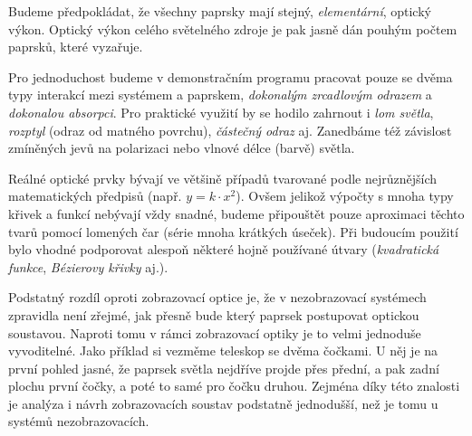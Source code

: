 Budeme předpokládat, že všechny paprsky mají stejný, \emph{elementární}, optický výkon. Optický výkon celého světelného zdroje je pak jasně dán pouhým počtem paprsků, které vyzařuje.

Pro jednoduchost budeme v demonstračním programu pracovat pouze se dvěma typy interakcí mezi systémem a paprskem, \emph{dokonalým zrcadlovým odrazem} a \emph{dokonalou absorpci}. Pro praktické využití by se hodilo zahrnout i \emph{lom světla}, \emph{rozptyl} (odraz od matného povrchu), \emph{částečný odraz} aj. Zanedbáme též závislost zmíněných jevů na polarizaci nebo vlnové délce (barvě) světla.



Reálné optické prvky bývají ve většině případů tvarované podle nejrůznějších matematických předpisů (např. $y = k \cdot x^2$). Ovšem jelikož výpočty s mnoha typy křivek a funkcí nebývají vždy snadné, budeme připouštět pouze aproximaci těchto tvarů pomocí lomených čar (série mnoha krátkých úseček). Při budoucím použití bylo vhodné podporovat alespoň některé hojně používané útvary (\emph{kvadratická funkce}, \emph{Bézierovy křivky} aj.).


Podstatný rozdíl oproti zobrazovací optice je, že v nezobrazovací systémech zpravidla není zřejmé, jak přesně bude který paprsek postupovat optickou soustavou. Naproti tomu v rámci zobrazovací optiky je to velmi jednoduše vyvoditelné. Jako příklad si vezměme teleskop se dvěma čočkami. U něj je na první pohled jasné, že paprsek světla nejdříve projde přes přední, a pak zadní plochu první čočky, a poté to samé pro čočku druhou. Zejména díky této znalosti je analýza i návrh zobrazovacích soustav podstatně jednodušší, než je tomu u systémů nezobrazovacích.
